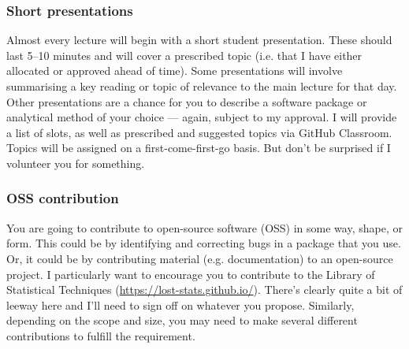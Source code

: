 \documentclass[12]{article}
\begin{document}
\vspace{-0.25cm}
\subsubsection*{Short presentations}

Almost every lecture will begin with a short student presentation. These should last 5--10 minutes and will cover a prescribed topic (i.e. that I have either allocated or approved ahead of time). Some presentations will involve summarising a key reading or topic of relevance to the main lecture for that day. Other presentations are a chance for you to describe a software package or analytical method of your choice --- again, subject to my approval. I will provide a list of slots, as well as prescribed and suggested topics via GitHub Classroom. Topics will be assigned on a first-come-first-go basis. But don't be surprised if I volunteer you for something.


\vspace{-0.25cm}
\subsubsection*{OSS contribution}

You are going to contribute to open-source software (OSS) in some way, shape, or form. This could be by identifying and correcting bugs in a package that you use. Or, it could be by contributing material (e.g. documentation) to an open-source project. I particularly want to encourage you to contribute to the Library of Statistical Techniques (\url{https://lost-stats.github.io/}). There's clearly quite a bit of leeway here and I'll need to sign off on whatever you propose. Similarly, depending on the scope and size, you may need to make several different contributions to fulfill the requirement.
\end{document}
